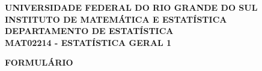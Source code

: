\documentclass[10pt]{article}%
\begin{document}
\begin{center}
{\bf 
UNIVERSIDADE FEDERAL DO RIO GRANDE DO SUL\\
INSTITUTO DE MATEMÁTICA E ESTATÍSTICA\\
DEPARTAMENTO DE ESTATÍSTICA\\
MAT02214 - ESTATÍSTICA GERAL 1}\\
\vspace*{0.1cm}{\bf ÁREA 3}
\end{center}
%
\begin{center}
{\bf FORMULÁRIO}
\end{center}
\end{document}
